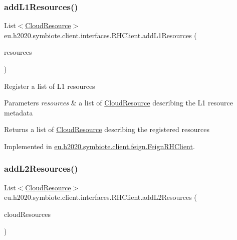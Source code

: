 \subsubsection{\texorpdfstring{add\+L1\+Resources()}{addL1Resources()}}
{\footnotesize\ttfamily List$<$\hyperlink{classeu_1_1h2020_1_1symbiote_1_1cloud_1_1model_1_1internal_1_1CloudResource}{Cloud\+Resource}$>$ eu.\+h2020.\+symbiote.\+client.\+interfaces.\+R\+H\+Client.\+add\+L1\+Resources (\begin{DoxyParamCaption}\item[{List$<$ \hyperlink{classeu_1_1h2020_1_1symbiote_1_1cloud_1_1model_1_1internal_1_1CloudResource}{Cloud\+Resource} $>$}]{resources }\end{DoxyParamCaption})}

Register a list of L1 resources


\begin{DoxyParams}{Parameters}
{\em resources} & a list of \hyperlink{}{Cloud\+Resource} describing the L1 resource metadata \\
\hline
\end{DoxyParams}
\begin{DoxyReturn}{Returns}
a list of \hyperlink{}{Cloud\+Resource} describing the registered resources 
\end{DoxyReturn}


Implemented in \hyperlink{classeu_1_1h2020_1_1symbiote_1_1client_1_1feign_1_1FeignRHClient_a4a6cb7cbfb9a41cf85a18c62cf257b69}{eu.\+h2020.\+symbiote.\+client.\+feign.\+Feign\+R\+H\+Client}.

\mbox{\label{interfaceeu_1_1h2020_1_1symbiote_1_1client_1_1interfaces_1_1RHClient_a456f65eb2b4db26964617571d617b2ba}} 
\subsubsection{\texorpdfstring{add\+L2\+Resources()}{addL2Resources()}}
{\footnotesize\ttfamily List$<$\hyperlink{classeu_1_1h2020_1_1symbiote_1_1cloud_1_1model_1_1internal_1_1CloudResource}{Cloud\+Resource}$>$ eu.\+h2020.\+symbiote.\+client.\+interfaces.\+R\+H\+Client.\+add\+L2\+Resources (\begin{DoxyParamCaption}\item[{List$<$ \hyperlink{classeu_1_1h2020_1_1symbiote_1_1cloud_1_1model_1_1internal_1_1CloudResource}{Cloud\+Resource} $>$}]{cloud\+Resources }\end{DoxyParamCaption})}

